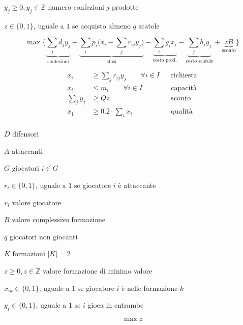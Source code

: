 $y_{j} \geq 0,y_{j} \in \mathbb{Z}$ numero confezioni $j$ prodotte

$z\in \{0,1\}$, uguale a $1$ se acquisto almeno $q$ scatole

\Fob

\begin{equation*}
	\max\bigg\{\underbrace{\sum _{j} d_{j} y_{j}}_{\text{confezioni}} +\underbrace{\sum _{i} p_{i}\bigg( x_{i} -\sum _{j} r_{ij} y_{j}\bigg)}_{\text{sfusi}} -\underbrace{\sum _{i} g_{i} x_{i}}_{\text{costo prod.}} -\underbrace{\sum _{j} b_{j} y_{j}}_{\text{costo scatole}} +\underbrace{zB}_{\text{sconto}}\bigg\}
\end{equation*}

\Vin

\begin{align*}
	x_{i} & \geq \sum _{j} r_{ij} y_{j} \qquad\forall i\in I && \text{richiesta} \\
	x_{i} & \leq m_{i} \qquad\forall i\in I && \text{capacità} \\
	\sum _{j} y_{j} & \geq Qz && \text{sconto} \\
	x_{1} & \geq 0.2\cdot \sum _{i} x_{i} && \text{qualità} \\
\end{align*}

\Es

\Par

$D$ difensori

$A$ attaccanti

$G$ giocatori $i\in G$

$r_{i} \in \{0,1\}$, uguale a $1$ se giocatore $i$ è attaccante

$v_{i}$ valore giocatore

$B$ valore complessivo formazione

$q$ giocatori non giocanti

$K$ formazioni $|K|=2$

\Var

$z\geq 0,z\in \mathbb{Z}$ valore formazione di minimo valore

$x_{ik} \in \{0,1\}$, uguale a $1$ se giocatore $i$ è nelle formazione $k$

$y_{i} \in \{0,1\}$, uguale a $1$ se $i$ gioca in entrambe

\Fob

\begin{equation*}
	\max z
\end{equation*}

\Vin

